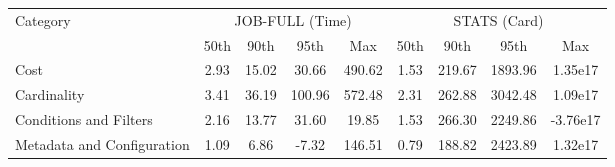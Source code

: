 \begin{tabular}{l|cccc|cccc}

\toprule

\multirow{2}{*}{Category} & \multicolumn{4}{c|}{JOB-FULL (Time)} & \multicolumn{4}{c|}{STATS (Card)} \\

 & 50th & 90th & 95th & Max & 50th & 90th & 95th & Max \\

\midrule

Cost & \cellcolor{green3}2.93 & \cellcolor{green3}15.02 & \cellcolor{green2}30.66 & \cellcolor{green3}490.62 & \cellcolor{green2}1.53 & \cellcolor{green2}219.67 & \cellcolor{green1}1893.96 & \cellcolor{green4}1.35e17 \\
Cardinality & \cellcolor{green4}3.41 & \cellcolor{green4}36.19 & \cellcolor{green4}100.96 & \cellcolor{green4}572.48 & \cellcolor{green4}2.31 & \cellcolor{green3}262.88 & \cellcolor{green4}3042.48 & \cellcolor{green2}1.09e17 \\
Conditions and Filters & \cellcolor{green2}2.16 & \cellcolor{green2}13.77 & \cellcolor{green3}31.60 & \cellcolor{green1}19.85 & \cellcolor{green3}1.53 & \cellcolor{green4}266.30 & \cellcolor{green2}2249.86 & \cellcolor{green1}-3.76e17 \\
Metadata and Configuration & \cellcolor{green1}1.09 & \cellcolor{green1}6.86 & \cellcolor{green1}-7.32 & \cellcolor{green2}146.51 & \cellcolor{green1}0.79 & \cellcolor{green1}188.82 & \cellcolor{green3}2423.89 & \cellcolor{green3}1.32e17 \\

\bottomrule
\end{tabular}